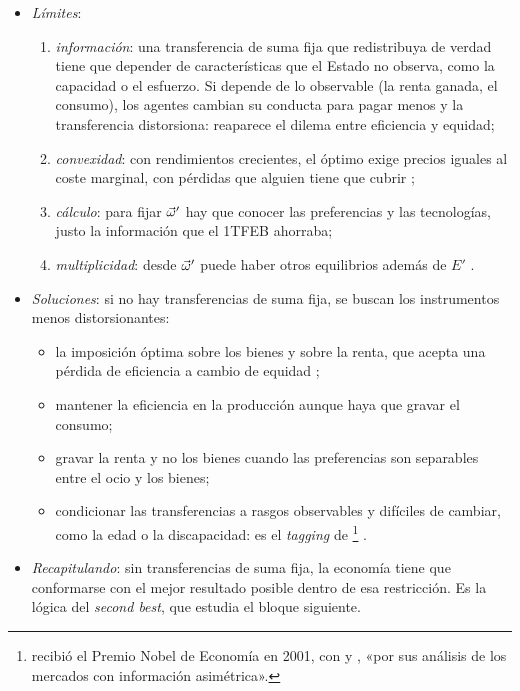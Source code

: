 \documentclass[11pt]{article}
\begin{document}
\begin{itemize}
\item \emph{Límites}:
  \begin{enumerate}
  \item \emph{información}: una transferencia de suma fija que redistribuya de verdad tiene que depender de características que el Estado no observa, como la capacidad o el esfuerzo. Si depende de lo observable (la renta ganada, el consumo), los agentes cambian su conducta para pagar menos y la transferencia distorsiona\nocite{Mirrlees1971Exploration}: reaparece el dilema entre eficiencia y equidad;
  \item \emph{convexidad}: con rendimientos crecientes, el óptimo exige precios iguales al coste marginal, con pérdidas que alguien tiene que cubrir ;
  \item \emph{cálculo}: para fijar $\vec{\omega}'$ hay que conocer las preferencias y las tecnologías, justo la información que el 1TFEB ahorraba;
  \item \emph{multiplicidad}: desde $\vec{\omega}'$ puede haber otros equilibrios además de $E'$ .
  \end{enumerate}
\item \emph{Soluciones}: si no hay transferencias de suma fija, se buscan los instrumentos menos distorsionantes:
  \begin{itemize}
  \item la imposición óptima sobre los bienes\nocite{Ramsey1927Contribution} y sobre la renta\nocite{Mirrlees1971Exploration}, que acepta una pérdida de eficiencia a cambio de equidad ;
  \item mantener la eficiencia en la producción aunque haya que gravar el consumo\nocite{DiamondMirrlees1971Optimal};
  \item gravar la renta y no los bienes cuando las preferencias son separables entre el ocio y los bienes\nocite{AtkinsonStiglitz1976Design};
  \item condicionar las transferencias a rasgos observables y difíciles de cambiar, como la edad o la discapacidad: es el \emph{tagging} de \textcite{Akerlof1978Economics}\footnote{ recibió el Premio Nobel de Economía en 2001, con  y , «por sus análisis de los mercados con información asimétrica»\nocite{Nobel2001AkerlofSpenceStiglitz}.} .
  \end{itemize}
\item \emph{Recapitulando}: sin transferencias de suma fija, la economía tiene que conformarse con el mejor resultado posible dentro de esa restricción. Es la lógica del \emph{second best}, que estudia el bloque siguiente.
\end{itemize}
\end{document}
